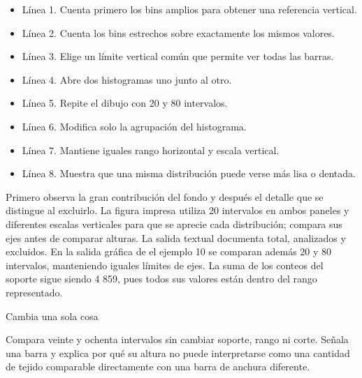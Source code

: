 \begin{itemize}

\item Línea 1. Cuenta primero los bins amplios para obtener una referencia vertical.

\item Línea 2. Cuenta los bins estrechos sobre exactamente los mismos valores.

\item Línea 3. Elige un límite vertical común que permite ver todas las barras.

\item Línea 4. Abre dos histogramas uno junto al otro.

\item Línea 5. Repite el dibujo con 20 y 80 intervalos.

\item Línea 6. Modifica solo la agrupación del histograma.

\item Línea 7. Mantiene iguales rango horizontal y escala vertical.

\item Línea 8. Muestra que una misma distribución puede verse más lisa o dentada.

\end{itemize}



Primero observa la gran contribución del fondo y después el detalle que se distingue al excluirlo. La figura impresa utiliza 20 intervalos en ambos paneles y diferentes escalas verticales para que se aprecie cada distribución; compara sus ejes antes de comparar alturas. La salida textual documenta total, analizados y excluidos. En la salida gráfica de el ejemplo 10 se comparan además 20 y 80 intervalos, manteniendo iguales límites de ejes. La suma de los conteos del soporte sigue siendo 4 859, pues todos sus valores están dentro del rango representado.



\begin{Practica}{Cambia una sola cosa}

Compara veinte y ochenta intervalos sin cambiar soporte, rango ni corte. Señala una barra y explica por qué su altura no puede interpretarse como una cantidad de tejido comparable directamente con una barra de anchura diferente.


\end{Practica}

